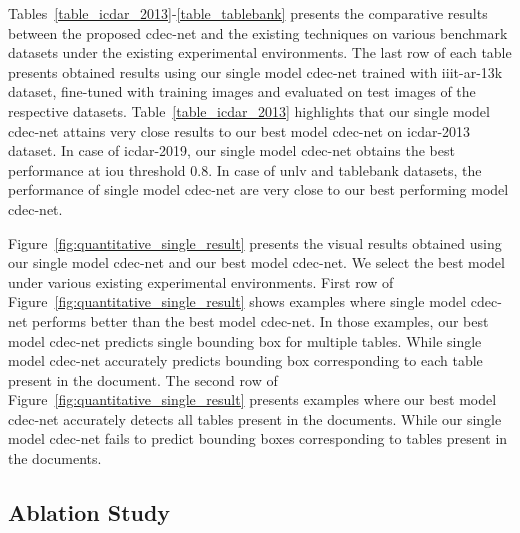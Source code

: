 \documentclass[a4paper,conference]{IEEEtran}
\begin{document}
Tables~\ref{table_icdar_2013}-\ref{table_tablebank} presents the comparative results between the proposed {\sc cd}e{\sc c-n}et and the existing techniques on various benchmark datasets under the existing experimental environments. The last row of each table presents obtained results using our single model {\sc cd}e{\sc c-n}et trained with {\sc iiit-ar-13k} dataset, fine-tuned with training images and evaluated on test images of the respective datasets. Table~\ref{table_icdar_2013} highlights that our single model {\sc cd}e{\sc c-n}et attains very close results to our best model {\sc cd}e{\sc c-n}et on {\sc icdar-2013} dataset. In case of {\sc icdar-2019}, our single model {\sc cd}e{\sc c-n}et obtains the best performance at {\sc i}o{\sc u} threshold 0.8. In case of {\sc unlv} and {\sc t}able{\sc b}ank datasets, the performance of single model {\sc cd}e{\sc c-n}et are very close to our best performing model {\sc cd}e{\sc c-n}et. 

Figure~\ref{fig:quantitative_single_result} presents the visual results obtained using our single model {\sc cd}e{\sc c-n}et and our best model {\sc cd}e{\sc c-n}et. We select the best model under various existing experimental environments. First row of Figure~\ref{fig:quantitative_single_result} shows examples where single model {\sc cd}e{\sc c-n}et performs better than the best model {\sc cd}e{\sc c-n}et. In those examples, our best model {\sc cd}e{\sc c-n}et predicts single bounding box for multiple tables. While single model {\sc cd}e{\sc c-n}et accurately predicts bounding box corresponding to each table present in the document. The second row of Figure~\ref{fig:quantitative_single_result} presents examples where our best model {\sc cd}e{\sc c-n}et accurately detects all tables present in the documents. While our single model {\sc cd}e{\sc c-n}et fails to predict bounding boxes corresponding to tables present in the documents. 

\subsection{Ablation Study}
\end{document}
